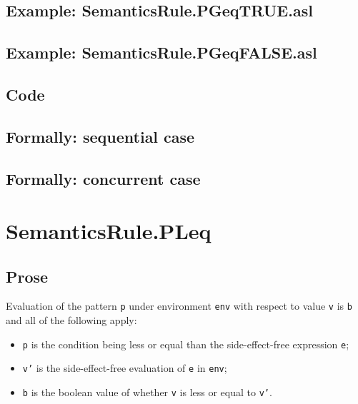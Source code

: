 \documentclass{book}
\begin{document}
    \subsection{Example: SemanticsRule.PGeqTRUE.asl}

    \subsection{Example: SemanticsRule.PGeqFALSE.asl}

  \subsection{Code}

\begin{emptyformal}
  \subsection{Formally: sequential case}

  \subsection{Formally: concurrent case}
\end{emptyformal}


\section{SemanticsRule.PLeq \label{sec:SemanticsRule.PLeq}}

    \subsection{Prose}
    Evaluation of the pattern \texttt{p} under environment \texttt{env} with
    respect to value \texttt{v} is \texttt{b} and all of the following apply:
    \begin{itemize}
      \item \texttt{p} is the condition being less or equal than the side-effect-free expression \texttt{e};
      \item \texttt{v'} is the side-effect-free evaluation of \texttt{e} in \texttt{env};
      \item \texttt{b} is the boolean value of whether \texttt{v} is less or equal to \texttt{v'}.
    \end{itemize}
\end{document}
